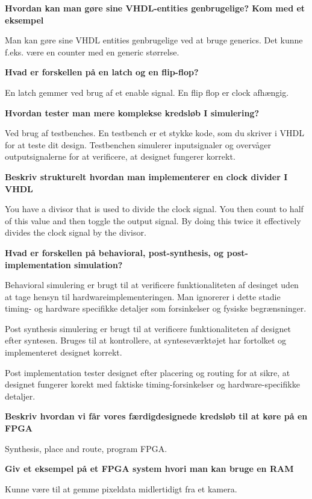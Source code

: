 \textbf{Hvordan kan man gøre sine VHDL-entities genbrugelige? Kom med et eksempel}

Man kan gøre sine VHDL entities genbrugelige ved at bruge generics.
Det kunne f.eks. være en counter med en generic størrelse.



\textbf{Hvad er forskellen på en latch og en flip-flop?}

En latch gemmer ved brug af et enable signal. En flip flop er clock afhængig.

\textbf{Hvordan tester man mere komplekse kredsløb I simulering?}

Ved brug af testbenches.
En testbench er et stykke kode, som du skriver i VHDL for at teste dit design.
Testbenchen simulerer inputsignaler og overvåger outputsignalerne for at verificere, at designet
fungerer korrekt.


\textbf{Beskriv strukturelt hvordan man implementerer en clock divider I VHDL}

You have a divisor that is used to divide the clock signal.
You then count to half of this value and then toggle the output signal.
By doing this twice it effectively divides the clock signal by the divisor.


\textbf{Hvad er forskellen på behavioral, post-synthesis, og post-implementation simulation?}

Behavioral simulering er brugt til at verificere funktionaliteten af desinget
uden at tage hensyn til hardwareimplementeringen.
Man ignorerer i dette stadie timing- og hardware specifikke detaljer som forsinkelser og fysiske
begrænsninger.

Post synthesis simulering er brugt til at verificere funktionaliteten af designet
efter syntesen. Bruges til at kontrollere, at synteseværktøjet har fortolket
og implementeret designet korrekt.

Post implementation tester designet efter placering og routing for at sikre, at designet
fungerer korekt med faktiske timing-forsinkelser og hardware-specifikke detaljer.


\textbf{Beskriv hvordan vi får vores færdigdesignede kredsløb til at køre på en FPGA}

Synthesis, place and route, program FPGA.


\textbf{Giv et eksempel på et FPGA system hvori man kan bruge en RAM}

Kunne være til at gemme pixeldata midlertidigt fra et kamera.






